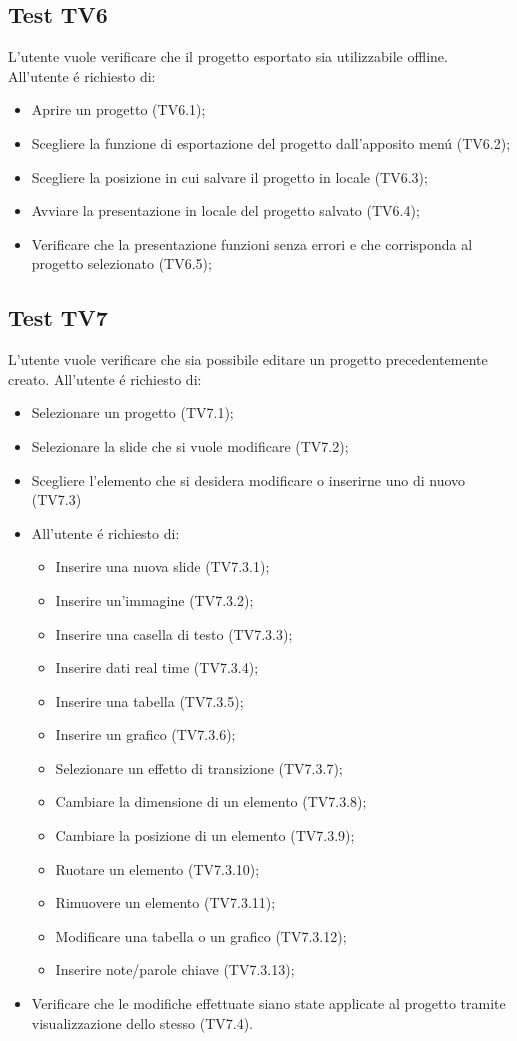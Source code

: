 \subsection{Test TV6}
L'utente vuole verificare che il progetto esportato sia utilizzabile offline. \newline
All'utente \'e richiesto di:
\begin{itemize}
	\item Aprire un progetto (TV6.1);
	\item Scegliere la funzione di esportazione del progetto dall'apposito men\'u (TV6.2);
	\item Scegliere la posizione in cui salvare il progetto in locale (TV6.3);
	\item Avviare la presentazione in locale del progetto salvato (TV6.4);
	\item Verificare che la presentazione funzioni senza errori e che corrisponda al progetto selezionato (TV6.5);
\end{itemize}

\subsection{Test TV7}
L'utente vuole verificare che sia possibile editare un progetto precedentemente creato. \newline
All'utente \'e richiesto di:
\begin{itemize}
	\item Selezionare un progetto (TV7.1);
	\item Selezionare la slide che si vuole modificare (TV7.2);
	\item Scegliere l'elemento che si desidera modificare o inserirne uno di nuovo (TV7.3)
	\item[] All'utente \'e richiesto di:
	\begin{itemize}
		\item Inserire una nuova slide (TV7.3.1);
		\item Inserire un'immagine (TV7.3.2);
		\item Inserire una casella di testo (TV7.3.3);
		\item Inserire dati \gls{real time} (TV7.3.4);
		\item Inserire una tabella (TV7.3.5);
		\item Inserire un grafico (TV7.3.6);
		\item Selezionare un effetto di transizione (TV7.3.7);
		\item Cambiare la dimensione di un elemento (TV7.3.8);
		\item Cambiare la posizione di un elemento (TV7.3.9);
		\item Ruotare un elemento (TV7.3.10);
		\item Rimuovere un elemento (TV7.3.11);
		\item Modificare una tabella o un grafico (TV7.3.12);
		\item Inserire note/parole chiave (TV7.3.13);
	\end{itemize}
	\item Verificare che le modifiche effettuate siano state applicate al progetto tramite visualizzazione dello stesso (TV7.4).
\end{itemize}

